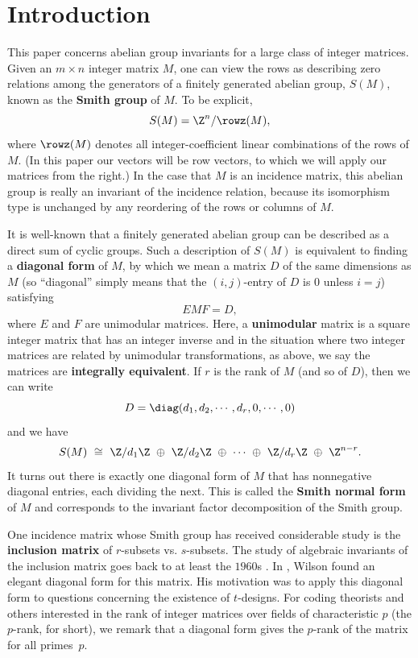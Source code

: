 \section{Introduction}

This paper concerns abelian group invariants for a large class of integer matrices.  Given an $m \times n$ integer matrix $M$, one can view the rows as describing zero relations among the generators of a finitely generated abelian group, $S(M)$, known as the {\bf Smith group} of $M$.  To be explicit,
\[
S(M) = \Z^{n} / \rowz(M),
\]
where $\rowz(M)$ denotes all integer-coefficient linear combinations of the rows of $M$.  (In this paper our vectors will be row vectors, to which we will apply our matrices from the right.)  In the case that $M$ is an incidence matrix, this abelian group is really an invariant of the incidence relation, because its isomorphism type is unchanged by any reordering of the rows or columns of $M$.  

It is well-known that a  finitely generated abelian group can be described as a direct sum of cyclic groups.  Such a description of $S(M)$ is equivalent to finding a {\bf diagonal form} of $M$, by which we mean a matrix $D$ of the same dimensions as $M$ (so ``diagonal'' simply means that the $(i,j)$-entry of $D$ is $0$ unless $i=j$) satisfying 
\[ E M F = D, \]
where $E$ and $F$ are unimodular matrices.  Here, a {\bf unimodular} matrix is a square integer matrix that has an integer inverse and in the situation where two integer matrices are related by unimodular transformations, as above, we say the matrices are {\bf integrally equivalent}.  If $r$ is the rank of $M$ (and so of $D$), then we can write
\[
D = \diag(d_{1}, d_{2}, \cdots, d_{r}, 0, \cdots, 0)
\]
and we have 
\[
S(M) \ \cong\  \Z/d_{1}\Z \ \oplus\ \Z/d_{2}\Z \ \oplus\ \cdots \ \oplus\ \Z/d_{r}\Z \ \oplus\ \Z^{n - r}.
\]
It turns out there is exactly one diagonal form of $M$ that has nonnegative diagonal entries, each dividing the next.  This is called the \textbf{Smith normal form} of $M$ and corresponds to the invariant factor decomposition of the Smith group.

One incidence matrix whose Smith group has received considerable study is the {\bf inclusion matrix} of $r$-subsets vs. $s$-subsets.  The study of algebraic invariants of the inclusion matrix goes back to at least the $1960$s \cite{gottlieb}.   In \cite{wilson_classic}, Wilson found an elegant diagonal form for this matrix.  His motivation was to apply this diagonal form to questions concerning the existence of $t$-designs. For coding theorists and others interested in the rank of integer matrices over fields of characteristic $p$ (the $p$-rank, for short), we remark that a diagonal form gives the $p$-rank of the matrix for all primes~$p$.

